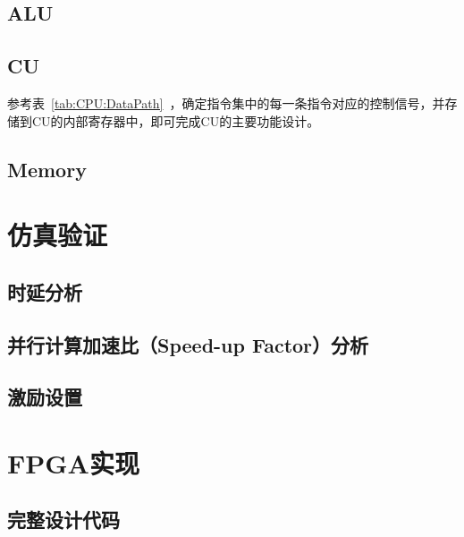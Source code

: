\documentclass[lang=cn,a4paper,newtx]{elegantpaper}
\begin{document}
\subsection{ALU}

\subsection{CU}
参考表~\ref{tab:CPU:DataPath}~，确定指令集中的每一条指令对应的控制信号，并存储到CU的内部寄存器中，即可完成CU的主要功能设计。


\subsection{Memory}




\section{仿真验证}
\subsection{时延分析}
\subsection{并行计算加速比（Speed-up Factor）分析}
\subsection{激励设置}

\section{FPGA实现}

\nocite{FPGA-CPU}

\printbibliography
\newpage
\addappheadtotoc
\begin{appendices}
  \section{完整设计代码}
\end{appendices}
\end{document}
